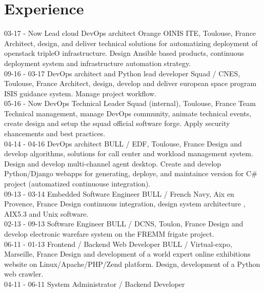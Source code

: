 \documentclass[]{friggeri-cv}
\begin{document}
\newpage
\section{Experience}
\begin{entrylist}
    \entry
        {03-17 - Now}
        {Lead cloud DevOps architect}
        {Orange OINIS ITE, Toulouse, France}
        {Architect, design, and deliver technical solutions for automatizing deployment of openstack tripleO infrastructure. Design Ansible based products, continuous deployment system and infrastructure automation strategy.\\}
    \entry
        {09-16 - 03-17}
        {DevOps architect and Python lead developer}
        {Squad / CNES, Toulouse, France}
        {Architect, design, develop and deliver european space program ISIS guidance system. Manage project workflow.\\}
    \entry
        {05-16 - Now}
        {DevOps Technical Leader}
        {Squad (internal), Toulouse, France}
        {Team Technical management, manage DevOps community, animate technical events, create design and setup the squad official software forge. Apply security ehancements and best practices.\\}
    \entry
        {04-14 - 04-16}
        {DevOps architect}
        {BULL / EDF, Toulouse, France}
        {Design and develop algorithms, solutions for call center and workload management system. Design and develop multi-channel agent desktop.
        Create and develop Python/Django webapps for generating, deploye, and maintaince version for C\# project (automatized continuouse integration).\\}
    \entry
        {09-13 - 03-14}
        {Embedded Software Engineer}
        {BULL / French Navy, Aix en Provence, France}
        {Design continuous integration, design system architecture , AIX5.3 and Unix software.\\}
    \entry
        {02-13 - 09-13}
        {Software Engineer}
        {BULL / DCNS, Toulon, France}
        {Design and develop electronic warefare system on the FREMM frigate project.\\}
    \entry
        {06-11 - 01-13}
        {Frontend / Backend Web Developer}
        {BULL / Virtual-expo, Marseille, France}
        {Design and development of a world expert online exhibitions website on Linux/Apache/PHP/Zend platform. Design, development of a Python web crawler.\\}
    \entry
        {04-11 - 06-11}
        {System Administrator / Backend Developer}

\end{entrylist}
\end{document}
